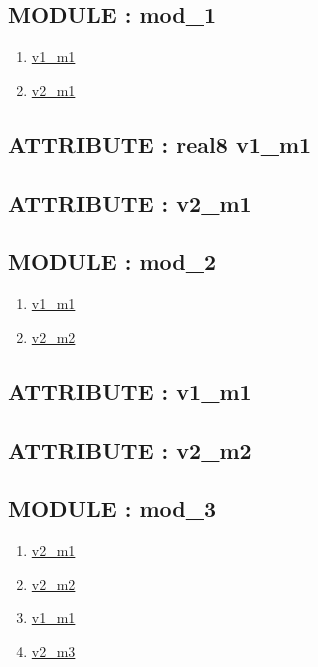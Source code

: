 \subsection*{MODULE : mod\_1}
\hypertarget{ecldoc:example_2_example_2.mod_1}{}
\begin{enumerate}
\item \hyperlink{ecldoc:example_2_example_2.mod_1.v1_m1}{v1\_m1}
\item \hyperlink{ecldoc:example_2_example_2.mod_1.v2_m1}{v2\_m1}
\end{enumerate}
\subsection*{ATTRIBUTE : real8 v1\_m1}
\hypertarget{ecldoc:example_2_example_2.mod_1.v1_m1}{}
\subsection*{ATTRIBUTE : v2\_m1}
\hypertarget{ecldoc:example_2_example_2.mod_1.v2_m1}{}

\subsection*{MODULE : mod\_2}
\hypertarget{ecldoc:example_2_example_2.mod_2}{}
\begin{enumerate}
\item \hyperlink{ecldoc:example_2_example_2.mod_2.v1_m1}{v1\_m1}
\item \hyperlink{ecldoc:example_2_example_2.mod_2.v2_m2}{v2\_m2}
\end{enumerate}
\subsection*{ATTRIBUTE : v1\_m1}
\hypertarget{ecldoc:example_2_example_2.mod_2.v1_m1}{}
\subsection*{ATTRIBUTE : v2\_m2}
\hypertarget{ecldoc:example_2_example_2.mod_2.v2_m2}{}

\subsection*{MODULE : mod\_3}
\hypertarget{ecldoc:example_2_example_2.mod_3}{}
\begin{enumerate}
\item \hyperlink{ecldoc:example_2_example_2.mod_1.v2_m1}{v2\_m1}
\item \hyperlink{ecldoc:example_2_example_2.mod_2.v2_m2}{v2\_m2}
\item \hyperlink{ecldoc:example_2_example_2.mod_3.v1_m1}{v1\_m1}
\item \hyperlink{ecldoc:example_2_example_2.mod_3.v2_m3}{v2\_m3}
\end{enumerate}
